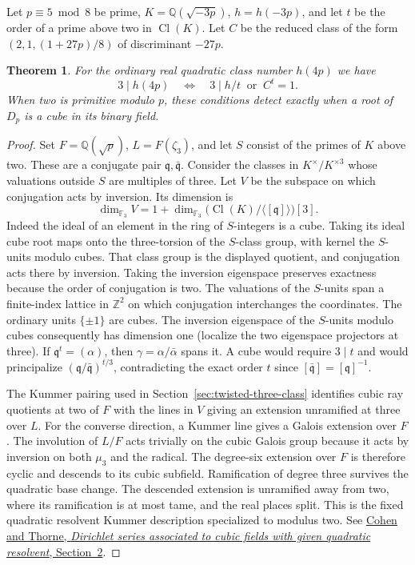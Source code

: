 \documentclass[11pt]{article}
\newtheorem{theorem}{Theorem}
\begin{document}
Let \(p\equiv5\bmod8\) be prime, \(K=\mathbb Q(\sqrt{-3p})\),
\(h=h(-3p)\), and let \(t\) be the order of a prime above two in
\(\operatorname{Cl}(K)\). Let \(C\) be the reduced class of the
form \((2,1,(1+27p)/8)\) of discriminant \(-27p\).
\begin{theorem}
For the ordinary real quadratic class number \(h(4p)\) we have
\[
       3\mid h(4p) \quad\Longleftrightarrow\quad 3\mid h/t\ \text{ or }\ C^t=1 .
\]
When two is primitive modulo \(p\), these conditions detect exactly
when a root of \(D_p\) is a cube in its binary field.
\end{theorem}
\begin{proof}
Set \(F=\mathbb Q(\sqrt p)\), \(L=F(\zeta_3)\), and let \(S\)
consist of the primes of \(K\) above two. These are a conjugate
pair \(\mathfrak q,\bar{\mathfrak q}\). Consider the classes in
\(K^\times/K^{\times3}\) whose valuations outside \(S\) are multiples
of three. Let \(V\) be the subspace on which conjugation acts by
inversion. Its dimension is
\[
  \dim_{\mathbb F_3}V=1+
  \dim_{\mathbb F_3}\bigl(\operatorname{Cl}(K)/\langle[\mathfrak q]\rangle\bigr)[3].
\]
Indeed the ideal of an element in the ring of \(S\)-integers is a
cube. Taking its ideal cube root maps onto the three-torsion of
the \(S\)-class group, with kernel the \(S\)-units modulo cubes.
That class group is the displayed quotient, and conjugation acts
there by inversion. Taking the inversion eigenspace preserves
exactness because the order of conjugation is two. The valuations
of the \(S\)-units span a finite-index lattice in \(\mathbb Z^2\)
on which conjugation interchanges the coordinates. The ordinary
units \(\{\pm1\}\) are cubes. The inversion eigenspace of the
\(S\)-units modulo cubes consequently has dimension one (localize
the two eigenspace projectors at three). If \(\mathfrak q^t=(\alpha)\),
then \(\gamma=\alpha/\bar\alpha\) spans it. A cube would require
\(3\mid t\) and would principalize \((\mathfrak q/\bar{\mathfrak q})^{t/3}\),
contradicting the exact order \(t\) since \([\bar{\mathfrak q}]=[\mathfrak q]^{-1}\).

The Kummer pairing used in Section~\ref{sec:twisted-three-class}
identifies cubic ray quotients at two of \(F\) with the lines in
\(V\) giving an extension unramified at three over \(L\).
For the converse direction, a Kummer line gives a Galois extension
over \(F\). The involution of \(L/F\) acts trivially on the cubic
Galois group because it acts by inversion on both \(\mu_3\) and the
radical. The degree-six extension over \(F\) is therefore cyclic
and descends to its cubic subfield. Ramification of degree three
survives the quadratic base change. The descended extension is
unramified away from two, where its ramification is at most tame,
and the real places split. This is the fixed quadratic resolvent
Kummer description specialized to modulus two. See
\href{https://arxiv.org/abs/1301.3563}{Cohen and Thorne,
\emph{Dirichlet series associated to cubic fields with given
quadratic resolvent}, Section~2}.


\end{proof}
\end{document}
